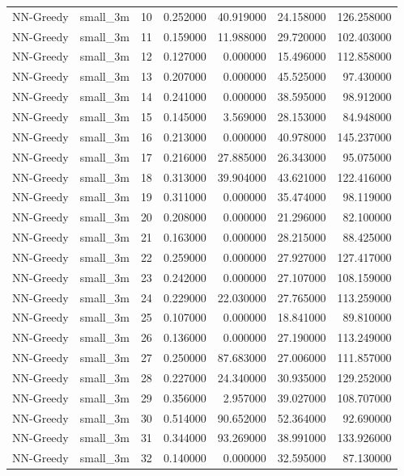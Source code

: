 \begin{tabular}{llrrrrr}
NN-Greedy & small_3m & 10 & 0.252000 & 40.919000 & 24.158000 & 126.258000 \\
NN-Greedy & small_3m & 11 & 0.159000 & 11.988000 & 29.720000 & 102.403000 \\
NN-Greedy & small_3m & 12 & 0.127000 & 0.000000 & 15.496000 & 112.858000 \\
NN-Greedy & small_3m & 13 & 0.207000 & 0.000000 & 45.525000 & 97.430000 \\
NN-Greedy & small_3m & 14 & 0.241000 & 0.000000 & 38.595000 & 98.912000 \\
NN-Greedy & small_3m & 15 & 0.145000 & 3.569000 & 28.153000 & 84.948000 \\
NN-Greedy & small_3m & 16 & 0.213000 & 0.000000 & 40.978000 & 145.237000 \\
NN-Greedy & small_3m & 17 & 0.216000 & 27.885000 & 26.343000 & 95.075000 \\
NN-Greedy & small_3m & 18 & 0.313000 & 39.904000 & 43.621000 & 122.416000 \\
NN-Greedy & small_3m & 19 & 0.311000 & 0.000000 & 35.474000 & 98.119000 \\
NN-Greedy & small_3m & 20 & 0.208000 & 0.000000 & 21.296000 & 82.100000 \\
NN-Greedy & small_3m & 21 & 0.163000 & 0.000000 & 28.215000 & 88.425000 \\
NN-Greedy & small_3m & 22 & 0.259000 & 0.000000 & 27.927000 & 127.417000 \\
NN-Greedy & small_3m & 23 & 0.242000 & 0.000000 & 27.107000 & 108.159000 \\
NN-Greedy & small_3m & 24 & 0.229000 & 22.030000 & 27.765000 & 113.259000 \\
NN-Greedy & small_3m & 25 & 0.107000 & 0.000000 & 18.841000 & 89.810000 \\
NN-Greedy & small_3m & 26 & 0.136000 & 0.000000 & 27.190000 & 113.249000 \\
NN-Greedy & small_3m & 27 & 0.250000 & 87.683000 & 27.006000 & 111.857000 \\
NN-Greedy & small_3m & 28 & 0.227000 & 24.340000 & 30.935000 & 129.252000 \\
NN-Greedy & small_3m & 29 & 0.356000 & 2.957000 & 39.027000 & 108.707000 \\
NN-Greedy & small_3m & 30 & 0.514000 & 90.652000 & 52.364000 & 92.690000 \\
NN-Greedy & small_3m & 31 & 0.344000 & 93.269000 & 38.991000 & 133.926000 \\
NN-Greedy & small_3m & 32 & 0.140000 & 0.000000 & 32.595000 & 87.130000 \\

\end{tabular}
